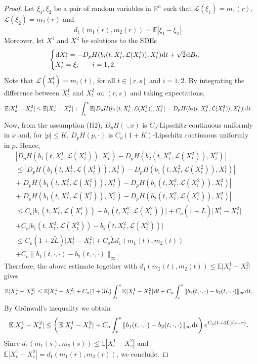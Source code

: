 \documentclass{amsart}
\theoremstyle{remark}
\theoremstyle{definition}
\theoremstyle{Claim}
\newcommand{\E}{\mathbb{E}}
\newcommand{\R}{\mathbb{R}}
\newcommand{\dd}{\hspace{0.7pt}{\rm d}}
\theoremstyle{plain}
\begin{document}
\begin{proof} Let $\xi_1, \xi_2$ be a pair of random variables in $\R^n$ such that $\mathcal L(\xi_1) = m_1(r)$, $\mathcal L(\xi_2) = m_2(r)$ and
	\[
	d_1(m_1(r), m_2(r)) = \E |\xi_1 - \xi_2|.
	\]
	Moreover, let $X^1$ and $X^2$ be solutions to the SDEs
	\[
	\begin{cases}
		\dd X^i_t = -D_p H(b_i(t,X_t^i,\mathcal{L}(X_t^i)),X^i_t) \dd t + \sqrt2 \dd B_t, \\
		X^i_r = \xi_i \qquad i=1,2.
	\end{cases}
	\]
	Note that $\mathcal L(X^i_t) = m_i(t)$, for all $t \in [r,s]$ and $i=1,2$. By integrating the difference between $X^1_t$ and $X^2_t$ on $(r,s)$ and taking expectations,
	\[
	\E |X^1_s - X^2_s| \le \E |X^1_r - X^2_r| + \int_r^s \E | D_p H(b_1(t,X_t^1,\mathcal{L}(X_t^1)),X^1_t) - D_p H(b_2(t,X_t^2,\mathcal{L}(X_t^2)),X^2_t)  | \dd t.
	\]
	Now, from the assumption (H2), $D_pH(\cdot,x)$ is $C_o$-Lipschitz continuous uniformly in $x$ and, for $\lvert p\rvert\leq K$, $D_pH(p,\cdot)$ is $C_o(1+K)$-Lipschitz continuous uniformly in $p$. Hence, 
	\begin{multline*}
		| D_p H(b_1(t,X_t^1,\mathcal{L}(X_t^1)),X^1_t) - D_p H(b_2(t,X_t^2,\mathcal{L}(X_t^2)),X^2_t)  |  \\
		\le| D_p H(b_1(t,X_t^1,\mathcal{L}(X_t^1)),X^1_t) - D_p H(b_1(t,X_t^2,\mathcal{L}(X_t^2)),X^1_t)  |\\ +|  D_p H(b_1(t,X_t^2,\mathcal{L}(X_t^2)),X^1_t)- D_p H(b_1(t,X_t^2,\mathcal{L}(X_t^2)),X^2_t)  | \\ + | D_p H(b_1(t,X_t^2,\mathcal{L}(X_t^2)),X^2_t) - D_p H(b_2(t,X_t^2,\mathcal{L}(X_t^2)),X^2_t)  |   \\\le
		C_o\lvert b_1(t,X_t^1,\mathcal{L}(X_t^1))-b_1(t,X_t^2,\mathcal{L}(X_t^2))\rvert+C_o(1+\tilde{L})\lvert X^1_t-X^2_t\rvert \\+  C_o\lvert b_1(t,X_t^2,\mathcal{L}(X_t^2)) -b_2(t,X_t^2,\mathcal{L}(X_t^2))\rvert  \\
		\le C_o(1+2\tilde{L})\lvert X^1_t-X^2_t\rvert +C_o\tilde{L}d_1(m_1(t),m_2(t))\\+  C_o \| b_1(t,\cdot,\cdot) - b_2(t,\cdot,\cdot) \|_\infty.
	\end{multline*}
	Therefore, the above estimate together with $d_1(m_2(t),m_2(t))\leq \E\lvert X^1_t-X^2_t\rvert$ gives
	\[
	\E |X^1_s - X^2_s| \le \E |X^1_r - X^2_r| + C_o(1+3\tilde{L})\int_r^s \E\lvert X^1_t-X^2_t\rvert \dd t +  C_o \int_r^s  \| b_1(t,\cdot,\cdot) - b_2(t,\cdot,\cdot) \|_\infty \dd t.
	\]
	By Gr\"onwall's inequality we obtain
	\begin{equation}\label{yyz}
		\E |X^1_s - X^2_s| \le \left(\E |X^1_r - X^2_r|  +  C_o\int_r^s  \| b_1(t,\cdot,\cdot) - b_2(t,\cdot,\cdot) \|_\infty \dd t\right)e^{ C_o(1+3\tilde{L})(s-r)}.
	\end{equation}
	Since $d_1(m_1(s), m_2(s)) \le \E |X^1_s - X^2_s|$ and $\E |X^1_r - X^2_r| =d_1(m_1(r), m_2(r))$, we conclude.
\end{proof}
\end{document}
